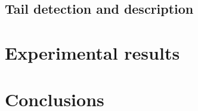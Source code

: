
\subsection{Tail detection and description} %
\label{sub:be:tail_detection_and_description}


\section{Experimental results}
\label{sec:be:experimental_results}


\section{Conclusions}
\label{sec:be:conclusion}
